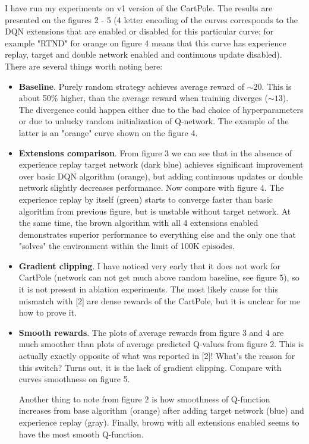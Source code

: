 \documentclass{article}
\begin{document}
I have run my experiments on v1 version of the CartPole. The results are presented on the figures 2 - 5 (4 letter encoding of the curves corresponds to the DQN extensions that are enabled or disabled for this particular curve; for example "RTND" for orange on figure 4 means that this curve has experience replay, target and double network enabled and continuous update disabled). There are several things worth noting here:
\begin{itemize}
\item {\bf Baseline}. Purely random strategy achieves average reward of $\sim 20$. This is about 50\% higher, than the average reward when training diverges ($\sim 13$). The divergence could happen either due to the bad choice of hyperparameters or due to unlucky random initialization of Q-network. The example of the latter is an "orange" curve shown on the figure 4.
\item {\bf Extensions comparison}. From figure 3 we can see that in the absence of experience replay target network (dark blue) achieves significant improvement over basic DQN algorithm (orange), but adding continuous updates or double network slightly decreases performance. Now compare with figure 4. The experience replay by itself (green) starts to converge faster than basic algorithm from previous figure, but is unstable without target network. At the same time, the brown  algorithm with all 4 extensions enabled demonstrates superior performance to everything else and the only one that "solves" the environment within the limit of 100K episodes.
\item {\bf Gradient clipping}. I have noticed very early that it does not work for CartPole (network can not get much above random baseline, see figure 5), so it is not present in ablation experiments. The most likely cause for this mismatch with [2] are dense rewards of the CartPole, but it is unclear for me how to prove it.
\item {\bf Smooth rewards}. The plots of average rewards from figure 3 and 4 are much smoother than plots of average predicted Q-values from figure 2. This is actually exactly opposite of what was reported in [2]! What's the reason for this switch? Turns out, it is the lack of gradient clipping. Compare with curves smoothness on figure 5.

  Another thing to note from figure 2 is how smoothness of Q-function increases from base algorithm (orange) after adding target network (blue) and experience replay (gray). Finally, brown with all extensions enabled seems to have the most smooth Q-function.
\end{itemize}
\end{document}
